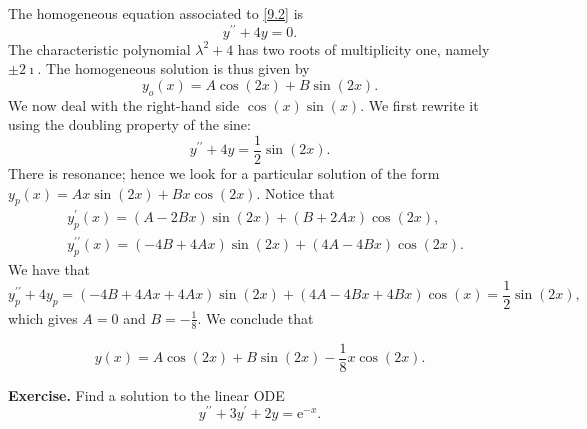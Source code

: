 \documentclass[a4paper,10 pt]{report}
\newcommand{\finalanswer}[1]{%
    \begin{finalAnswer}
    \[
        #1
    \]
    \end{finalAnswer}
}
\theoremstyle{definition}
\begin{document}
\begin{solutionBox} The homogeneous equation associated to \eqref{9.2} is
\begin{equation} \label{9.2.1} y^{\prime \prime} + 4y = 0. \end{equation}
The characteristic polynomial $\lambda^2 + 4$ has two roots of multiplicity one, namely $\pm 2 \imath$. The homogeneous solution is thus given by
\begin{equation*} y_o(x) = A \cos(2x) + B \sin(2x). \end{equation*}
We now deal with the right-hand side $\cos(x) \sin(x)$. We first rewrite it using the doubling property of the sine:
\begin{equation*} y^{\prime \prime} + 4y =  \frac{1}{2} \sin(2x). \end{equation*}
There is resonance; hence we look for a particular solution of the form $y_p(x) = A x \sin(2x) + B x \cos(2x)$. Notice that
\begin{equation*}\begin{aligned} & y_p^\prime(x) = (A - 2Bx) \sin(2x) + (B + 2Ax) \cos(2x),
\\[1em] & y_p^{\prime \prime}(x) = (-4B + 4Ax) \sin(2x) + (4A - 4Bx) \cos(2x). \end{aligned} \end{equation*}
We have that
\begin{equation*} y_p^{\prime \prime} + 4y_p = (-4B + 4Ax + 4Ax) \sin(2x) + (4A - 4Bx + 4Bx) \cos(x) = \frac{1}{2} \sin(2x), \end{equation*}
which gives $ A = 0$ and $B = - \frac{1}{8}$. We conclude that
\finalanswer{
y(x) = A \cos(2x) + B \sin(2x) - \frac{1}{8} x \cos(2x).
}
\end{solutionBox}

\begin{exerciseBox} \textbf{Exercise.}  Find a solution to the linear ODE
\begin{equation} \label{9.3} y^{\prime \prime} + 3y^\prime + 2y = \mathrm{e}^{-x}. \end{equation} \end{exerciseBox}
\end{document}
